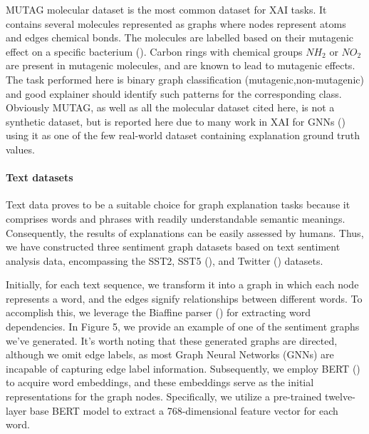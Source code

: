 \documentclass[binding=0.6cm]{sapthesis}
\newcommand{\mycite}[1]{(\cite{#1})}
\begin{document}
MUTAG molecular dataset is the most common dataset for XAI tasks. It contains several molecules represented as graphs where nodes represent atoms and edges chemical bonds. The molecules are labelled based on their mutagenic effect on a specific bacterium \mycite{debnath1991-mutag}. Carbon rings with chemical groups $NH_2$ or $NO_2$ are present in mutagenic molecules, and are known to lead to mutagenic effects.
The task performed here is binary graph classification (mutagenic,non-mutagenic) and good explainer should identify such patterns for the corresponding class. Obviously MUTAG, as well as all the molecular dataset cited here, is not a synthetic dataset, but is reported here due to many work in XAI for GNNs (\cite{ying2019-gnnexplainer,luo2020-pgexplainer,spinelli2022-mate-maml}) using it as one of the few real-world dataset containing explanation ground truth values.


\paragraph{Text datasets}
\label{sec:expRes.text-data}
Text data proves to be a suitable choice for graph explanation tasks because it comprises words and phrases with readily understandable semantic meanings. Consequently, the results of explanations can be easily assessed by humans. Thus, we have constructed three sentiment graph datasets based on text sentiment analysis data, encompassing the SST2, SST5 \mycite{socher2013-SST2-5}, and Twitter \mycite{dong2014-twitter} datasets.

Initially, for each text sequence, we transform it into a graph in which each node represents a word, and the edges signify relationships between different words. To accomplish this, we leverage the Biaffine parser \mycite{gardner2018-allennlp} for extracting word dependencies. In Figure 5, we provide an example of one of the sentiment graphs we've generated. It's worth noting that these generated graphs are directed, although we omit edge labels, as most Graph Neural Networks (GNNs) are incapable of capturing edge label information. Subsequently, we employ BERT \mycite{devlin2018-bert} to acquire word embeddings, and these embeddings serve as the initial representations for the graph nodes. Specifically, we utilize a pre-trained twelve-layer base BERT model to extract a 768-dimensional feature vector for each word.
\end{document}
